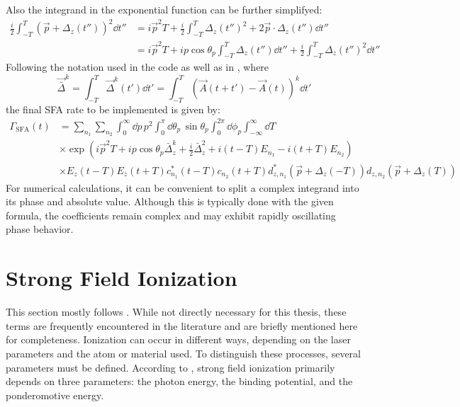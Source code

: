 Also the integrand in the exponential function can be further simplifyed:
\begin{align*}
    \frac{i}{2}\int_{-T}^{T}(\vec{p}+\Delta_z(t''))^2\dd t'' &= i\vec{p}^2T + \frac{i}{2}\int_{-T}^{T}\Delta_z(t'')^2+2\vec{p}\cdot\Delta_z(t'')\dd t'' \\
    &= i\vec{p}^2T + ip\cos\theta_p\int_{-T}^{T}\Delta_z(t'')\dd t'' +  \frac{i}{2}\int_{-T}^{T}\Delta_z(t'')^2\dd t''
\end{align*}
Following the notation used in the code as well as in \cite{Theory_NPS}, where
\begin{equation*}
    \vec{\bar{\Delta}}^k = \int_{-T}^{T}\vec{\Delta}^k(t')\dd t' = \int_{-T}^{T}\left(\vec{A}(t+t') - \vec{A}(t)\right)^k\dd t'
\end{equation*}
the final SFA rate to be implemented is given by:
\begin{align}
    \Gamma_{\mathrm{SFA}}(t) &= \sum_{n_1}\sum_{n_2} \int_0^{\infty} \dd p\,p^2\int_0^{\pi} \dd\theta_p\,\sin\theta_p \int_0^{2\pi}\dd \phi_p\int_{-\infty}^{\infty} \dd T\\
    &\times \exp\left(i\vec{p}^2T + ip\cos\theta_p\bar{\Delta}_z^k +  \frac{i}{2}\bar{\Delta}_z^2  + i(t-T)E_{n_1}-i(t+T)E_{n_2}\right)\\
    &\times E_z(t-T) E_z(t+T)c_{n_1}^*(t-T)c_{n_2}(t+T) d_{z,n_1}^*(\vec{p}+\Delta_z(-T))d_{z,n_2}(\vec{p}+\Delta_z(T))
    \label{eq:sfa_rate_improved}
\end{align}
For numerical calculations, it can be convenient to split a complex integrand into its phase and absolute value.
Although this is typically done with the given formula, the coefficients remain complex and may exhibit rapidly oscillating phase behavior.







\section{Strong Field Ionization}
This section mostly follows \cite{manorammasterthesis}.
While not directly necessary for this thesis, these terms are frequently encountered in the literature and are briefly mentioned here for completeness.
Ionization can occur in different ways, depending on the laser parameters and the atom or material used.
To distinguish these processes, several parameters must be defined.
According to \cite{Keldysh:1965ojf}, strong field ionization primarily depends on three parameters: the photon energy, the binding potential, and the ponderomotive energy.

